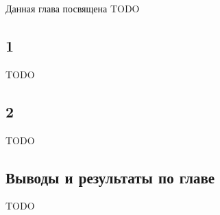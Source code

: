 \documentclass[../diploma.tex]{subfiles}
\begin{document}
\label{sec:3}

Данная глава посвящена TODO

\subsection{1}

TODO

\subsection{2}

TODO

\subsection{Выводы и результаты по главе}

TODO
\end{document}
